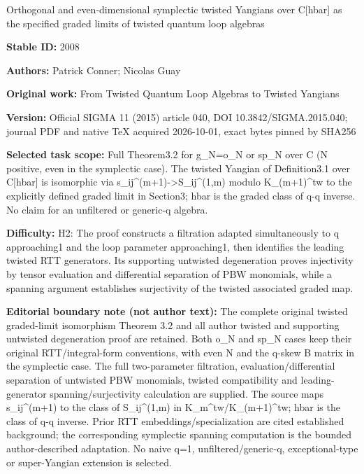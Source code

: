 \documentclass[11pt]{article}
\numberwithin{theorem}{section}
\numberwithin{proposition}{section}
\numberwithin{lemma}{section}
\numberwithin{corollary}{section}
\numberwithin{definition}{section}
\numberwithin{example}{section}
\numberwithin{remark}{section}
\numberwithin{note}{section}
\numberwithin{equation}{section}
\begin{document}
\begin{center}\Large Orthogonal and even-dimensional symplectic twisted Yangians over C[hbar] as the specified graded limits of twisted quantum loop algebras\end{center}
\noindent\textbf{Stable ID:} 2008\par
\noindent\textbf{Authors:} Patrick Conner; Nicolas Guay\par
\noindent\textbf{Original work:} From Twisted Quantum Loop Algebras to Twisted Yangians\par
\noindent\textbf{Version:} Official SIGMA 11 (2015) article 040, DOI 10.3842/SIGMA.2015.040; journal PDF and native TeX acquired 2026-10-01, exact bytes pinned by SHA256\par
\noindent\textbf{Selected task scope:} Full Theorem3.2 for g\_N=\allowbreak{}o\_N or sp\_N over C (N positive, even in the symplectic case). The twisted Yangian of Definition3.1 over C[hbar] is isomorphic via s\_ij\textasciicircum{}(m+\allowbreak{}1)->S\_ij\textasciicircum{}(1,m) modulo K\_(m+\allowbreak{}1)\textasciicircum{}tw to the explicitly defined graded limit in Section3; hbar is the graded class of q-q inverse. No claim for an unfiltered or generic-q algebra.\par
\noindent\textbf{Difficulty:} H2: The proof constructs a filtration adapted simultaneously to q approaching1 and the loop parameter approaching1, then identifies the leading twisted RTT generators. Its supporting untwisted degeneration proves injectivity by tensor evaluation and differential separation of PBW monomials, while a spanning argument establishes surjectivity of the twisted associated graded map.\par
\noindent\textbf{Editorial boundary note (not author text):} The complete original twisted graded-limit isomorphism Theorem 3.2 and all author twisted and supporting untwisted degeneration proof are retained. Both o\_N and sp\_N cases keep their original RTT/integral-form conventions, with even N and the q-skew B matrix in the symplectic case. The full two-parameter filtration, evaluation/differential separation of untwisted PBW monomials, twisted compatibility and leading-generator spanning/surjectivity calculation are supplied. The source maps s\_ij\textasciicircum{}(m+\allowbreak{}1) to the class of S\_ij\textasciicircum{}(1,m) in K\_m\textasciicircum{}tw/K\_(m+\allowbreak{}1)\textasciicircum{}tw; hbar is the class of q-q inverse. Prior RTT embeddings/specialization are cited established background; the corresponding symplectic spanning computation is the bounded author-described adaptation. No naive q=\allowbreak{}1, unfiltered/generic-q, exceptional-type or super-Yangian extension is selected.\par
\end{document}
